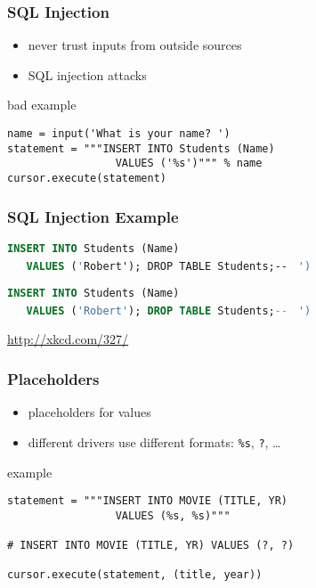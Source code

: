 \documentclass[dvipsnames]{beamer}
\theoremstyle{plain}
\begin{document}
\begin{frame}[fragile]
  \frametitle{SQL Injection}

  \begin{itemize}
    \item never trust inputs from outside sources
    \item \alert{SQL injection} attacks
  \end{itemize}

  \medskip
  \begin{exampleblock}{bad example}
    \begin{lstlisting}
name = input('What is your name? ')
statement = """INSERT INTO Students (Name)
                 VALUES ('%s')""" % name
cursor.execute(statement)
    \end{lstlisting}
  \end{exampleblock}
\end{frame}

\begin{frame}[fragile]
  \frametitle{SQL Injection Example}

  \begin{center}
  \end{center}

  \vspace{-6pt}
  \lstinline[language=SQL]!INSERT INTO Students (Name)!\\
  \lstinline[language=SQL]!   VALUES ('!\alert{\lstinline!Robert'); DROP TABLE Students;-- !}
  \lstinline[language=SQL]!')!

  \lstinline[language=SQL]!INSERT INTO Students (Name)!\\
  \lstinline[language=SQL]!   VALUES ('Robert'); DROP TABLE Students;-- !
  \lstinline[language=SQL]!')!

  \begin{tiny}
    \url{http://xkcd.com/327/}
  \end{tiny}
\end{frame}

\begin{frame}[fragile]
  \frametitle{Placeholders}

  \begin{itemize}
    \item placeholders for values
    \item different drivers use different formats:
      \lstinline!%s!, \lstinline!?!, \ldots
  \end{itemize}

  \medskip
  \begin{exampleblock}{example}
    \begin{lstlisting}
statement = """INSERT INTO MOVIE (TITLE, YR)
                 VALUES (%s, %s)"""

# INSERT INTO MOVIE (TITLE, YR) VALUES (?, ?)

cursor.execute(statement, (title, year))
    \end{lstlisting}
  \end{exampleblock}
\end{frame}
\end{document}
